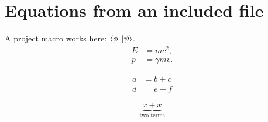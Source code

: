 \section{Equations from an included file}
A project macro works here: $\left\langle\phi\right|\left|\psi\right\rangle$.
\begin{align}
    E &= mc^2 , \label{eq:energy} \\
    p &= \gamma mv .
\end{align}

\[
\begin{aligned}
    a &= b+c \\
    d &= e+f
\end{aligned}
\]

\[\underbrace{x+x}_{\text{two terms}}\]
